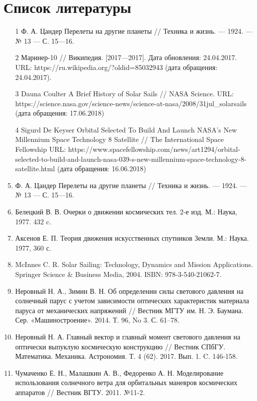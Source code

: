\chapter{Список литературы}
\begin{enumerate}
    \item[1] Ф. А. Цандер Перелеты на другие планеты // Техника и жизнь. — 1924. — № 13 — С. 15—16.
    \item[2] Маринер-10 // Википедия. [2017—2017]. Дата обновления: 24.04.2017. URL: https://ru.wikipedia.org/?oldid=85032943 (дата обращения: 24.04.2017).
    \item[3] Dauna Coulter A Brief History of Solar Sails // NASA Science. URL: https://science.nasa.gov/science-news/science-at-nasa/2008/31jul\_solarsails
    (дата обращения: 17.06.2018)
    \item[4] Sigurd De Keyser Orbital Selected To Build And Launch NASA's New Millennium Space Technology 8 Satellite // The International Space Fellowship
    URL: https://www.spacefellowship.com/news/art1294/orbital-selected-to-build-and-launch-nasa-039-s-new-millennium-space-technology-8-satellite.html
    (дата обращения: 16.06.2018)
    \item Ф. А. Цандер Перелеты на другие планеты // Техника и жизнь. — 1924. — № 13 — С. 15—16.
    \item Белецкий В. В. Очерки о движении космических тел. 2-е изд. М.: Наука, 1977. 432 c.
    \item Аксенов Е. П. Теория движения искусственных спутников Земли. М.: Наука. 1977, 360 с.
    \item McInnes C. R. Solar Sailing: Technology, Dynamics and Mission Applications. Springer Science \&
Business Media, 2004. ISBN: 978-3-540-21062-7.
    \item Неровный Н. А., Зимин В. Н. Об определении силы светового давления на солнечный парус
с учетом зависимости оптических характеристик материала паруса от механических напряжений //
Вестник МГТУ им. Н. Э. Баумана. Сер. «Машиностроение». 2014. Т. 96, No 3. С. 61–78.
    \item Неровный Н. А. Главный вектор и главный момент светового давления на оптически выпуклую космическую конструкцию //
Вестник СПбГУ. Математика. Механика. Астрономия. Т. 4 (62). 2017. Вып. 1. C. 146-158.
    \item Чумаченко Е. Н., Малашкин А. В., Федоренко А. Н. Моделирование использования солнечного ветра
для орбитальных маневров космических аппаратов // Вестник ВГТУ. 2011. №11-2.

\end{enumerate}
